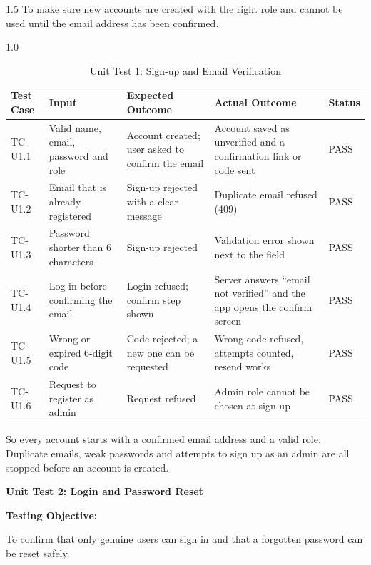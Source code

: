 \documentclass[A4paper,12pt]{report}
\theoremstyle{plain}
\theoremstyle{definition}
\theoremstyle{remark}
\numberwithin{equation}{section}
\begin{document}
\begin{spacing}{1.5}
To make sure new accounts are created with the right role and cannot be used until the email address has been confirmed.

\begin{table}[H]
\centering
\caption{Unit Test 1: Sign-up and Email Verification}
\begin{spacing}{1.0}
{\small
\begin{tabular}{|p{}|p{}|p{}|p{}|p{}|}
\hline
\textbf{Test Case} & \textbf{Input} & \textbf{Expected Outcome} & \textbf{Actual Outcome} & \textbf{Status} \\ \hline
TC-U1.1 & Valid name, email, password and role & Account created; user asked to confirm the email & Account saved as unverified and a confirmation link or code sent & PASS \\ \hline
TC-U1.2 & Email that is already registered & Sign-up rejected with a clear message & Duplicate email refused (409) & PASS \\ \hline
TC-U1.3 & Password shorter than 6 characters & Sign-up rejected & Validation error shown next to the field & PASS \\ \hline
TC-U1.4 & Log in before confirming the email & Login refused; confirm step shown & Server answers ``email not verified'' and the app opens the confirm screen & PASS \\ \hline
TC-U1.5 & Wrong or expired 6-digit code & Code rejected; a new one can be requested & Wrong code refused, attempts counted, resend works & PASS \\ \hline
TC-U1.6 & Request to register as admin & Request refused & Admin role cannot be chosen at sign-up & PASS \\ \hline
\end{tabular}}
\end{spacing}
\end{table}

So every account starts with a confirmed email address and a valid role. Duplicate emails, weak passwords and attempts to sign up as an admin are all stopped before an account is created.

\textbf{Unit Test 2: Login and Password Reset}

\textbf{Testing Objective:}

To confirm that only genuine users can sign in and that a forgotten password can be reset safely.


\end{spacing}
\end{document}
